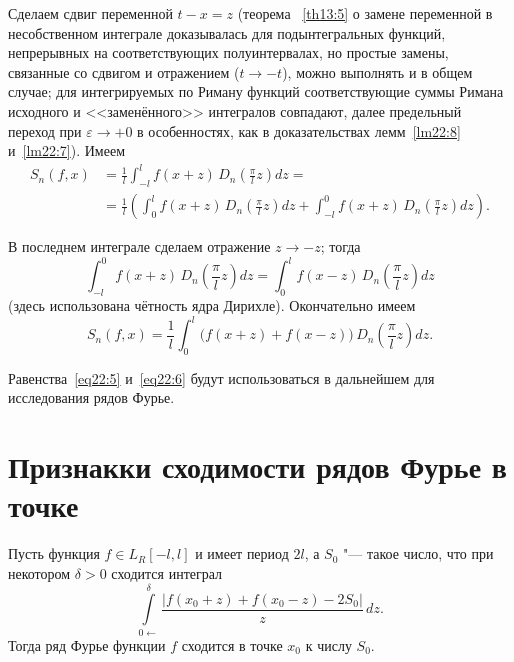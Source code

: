 Сделаем сдвиг переменной $t - x = z$ (теорема ~\ref{th13:5} о замене переменной в несобственном интеграле доказывалась для подынтегральных функций, непрерывных на соответствующих полуинтервалах, но простые замены, связанные со сдвигом и отражением ($t \to -t$), можно выполнять и в общем случае; для интегрируемых по Риману функций соответствующие суммы Римана исходного и <<заменённого>> интегралов совпадают, далее предельный переход при $\varepsilon \to +0$ в особенностях, как в доказательствах лемм~\ref{lm22:8} и~\ref{lm22:7}). Имеем
\begin{equation} \label{eq22:5}
\begin{aligned}
S_n(f, x) &= \frac{1}{l} \int_{-l}^{l} f(x + z)\, D_n\!\left(\frac{\pi}{l} z\right) dz = \\
&= \frac{1}{l} \left(\int_0^{l} f(x + z)\, D_n\!\left(\frac{\pi}{l} z\right) dz + \int_{-l}^{0} f(x + z)\, D_n\!\left(\frac{\pi}{l} z\right) dz\right).
\end{aligned}
\end{equation}

В последнем интеграле сделаем отражение $z \to -z$; тогда
$$
\int_{-l}^{0} f(x + z)\, D_n\!\left(\frac{\pi}{l} z\right) dz = \int_0^{l} f(x - z)\, D_n\!\left(\frac{\pi}{l} z\right) dz
$$
(здесь использована чётность ядра Дирихле). Окончательно имеем
\begin{equation} \label{eq22:6}
S_n(f, x) = \frac{1}{l} \int_0^{l} \bigl(f(x + z) + f(x - z)\bigr)\, D_n\!\left(\frac{\pi}{l} z\right) dz.
\end{equation}

Равенства~\eqref{eq22:5} и~\eqref{eq22:6} будут использоваться в дальнейшем для исследования рядов Фурье.

\section{Признакки сходимости рядов Фурье в точке}

\begin{thm}
Пусть функция $f \in L_R[-l, l]$ и имеет период $2l$, а $S_0$ "--- такое число, что при некотором $\delta > 0$ сходится интеграл
$$
\int\limits_{0\leftarrow}^{\delta} \frac{|f(x_0 + z) + f(x_0 - z) - 2 S_0|}{z}\,dz.
$$
Тогда ряд Фурье функции $f$ сходится в точке $x_0$ к числу $S_0$.
\end{thm}

